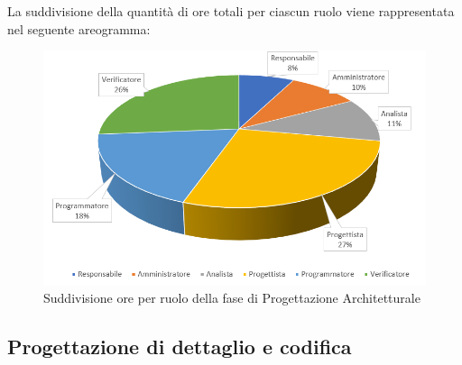 La suddivisione della quantità di ore totali per ciascun ruolo viene rappresentata nel seguente areogramma:

\begin{figure}[h]
	\centering
	\caption{Suddivisione ore per ruolo della fase di Progettazione Architetturale}
	
	\includegraphics[scale=1.9]{sezioni/Aerogrammi/AerogrammaProgettArchitetturale.png}
\end{figure}

\clearpage
\subsection{Progettazione di dettaglio e codifica}

